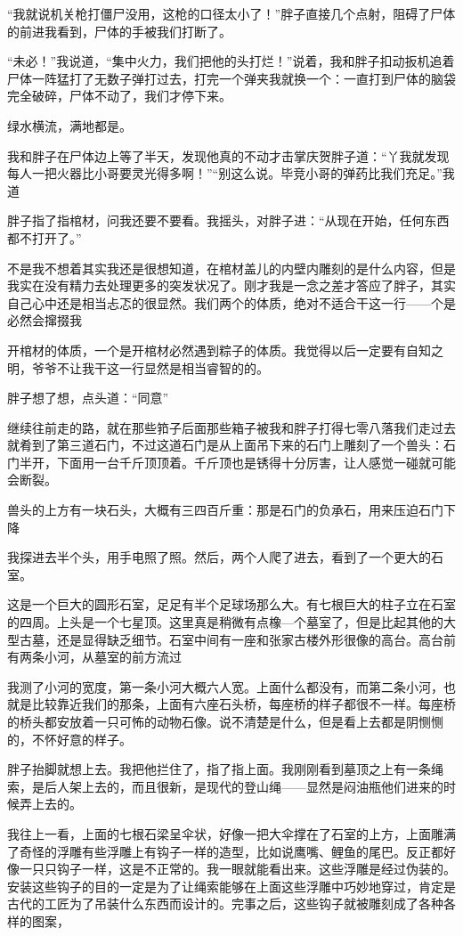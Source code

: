 “我就说机关枪打僵尸没用，这枪的口径太小了！”胖子直接几个点射，阻碍了尸体的前进我看到，尸体的手被我们打断了。

“未必！”我说道，“集中火力，我们把他的头打烂！”说着，我和胖子扣动扳机追着尸体一阵猛打了无数子弹打过去，打完一个弹夹我就换一个：一直打到尸体的脑袋完全破碎，尸体不动了，我们才停下来。

绿水横流，满地都是。

我和胖子在尸体边上等了半天，发现他真的不动才击掌庆贺胖子道：“丫我就发现每人一把火器比小哥要灵光得多啊！”“别这么说。毕竞小哥的弹药比我们充足。”我道

胖子指了指棺材，问我还要不要看。我摇头，对胖子进：“从现在开始，任何东西都不打开了。”

不是我不想着其实我还是很想知道，在棺材盖儿的内壁内雕刻的是什么内容，但是我实在没有精力去处理更多的突发状况了。刚才我是一念之差才答应了胖子，其实自己心中还是相当忐忑的很显然。我们两个的体质，绝对不适合干这一行——个是必然会撺掇我

开棺材的体质，一个是开棺材必然遇到粽子的体质。我觉得以后一定要有自知之明，爷爷不让我干这一行显然是相当睿智的的。

胖子想了想，点头道：“同意”

继续往前走的路，就在那些筘子后面那些箱子被我和胖子打得七零八落我们走过去就肴到了第三道石门，不过这道石门是从上面吊下来的石门上雕刻了一个兽头：石门半开，下面用一台千斤顶顶着。千斤顶也是锈得十分厉害，让人感觉一碰就可能会断裂。

兽头的上方有一块石头，大概有三四百斤重：那是石门的负承石，用来压迫石门下降

我探进去半个头，用手电照了照。然后，两个人爬了进去，看到了一个更大的石室。

这是一个巨大的圆形石室，足足有半个足球场那么大。有七根巨大的柱子立在石室的四周。上头是一个七星顶。这里真是稍微有点橡—个墓室了，但是比起其他的大型古墓，还是显得缺乏细节。石室中间有一座和张家古楼外形很像的高台。高台前有两条小河，从墓室的前方流过

我测了小河的宽度，第一条小河大概六人宽。上面什么都没有，而第二条小河，也就是比较靠近我们的那条，上面有六座石头桥，每座桥的样子都很不一样。每座桥的桥头都安放着一只可怖的动物石像。说不清楚是什么，但是看上去都是阴恻恻的，不怀好意的样子。

胖子抬脚就想上去。我把他拦住了，指了指上面。我刚刚看到墓顶之上有一条绳索，是后人架上去的，而且很新，是现代的登山绳——显然是闷油瓶他们进来的时候弄上去的。

我往上一看，上面的七根石梁呈伞状，好像一把大伞撑在了石室的上方，上面雕满了奇怪的浮雕有些浮雕上有钩子一样的造型，比如说鹰嘴、鲤鱼的尾巴。反正都好像一只只钩子一样，这是不正常的。我一眼就能看出来。这些浮雕是经过伪装的。安装这些钩子的目的一定是为了让绳索能够在上面这些浮雕中巧妙地穿过，肯定是古代的工匠为了吊装什么东西而设计的。完事之后，这些钩子就被雕刻成了各种各样的图案，

